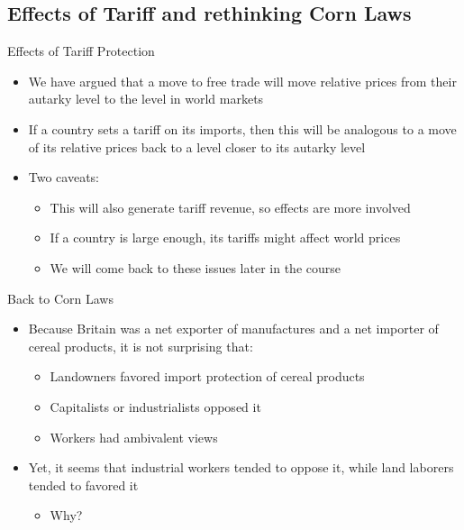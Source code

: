\documentclass[10pt,hyperref={CJKbookmarks=true},xcolor=dvipsnames,aspectratio=169]{beamer}
\begin{document}
\subsection{Effects of Tariff and rethinking Corn Laws}
\begin{frame}{Effects of Tariff Protection}

\begin{itemize}
\item We have argued that a move to free trade will move relative prices
from their autarky level to the level in world markets 
\item If a country sets a tariff on its imports, then this will be analogous
to a move of its relative prices back to a level closer to its autarky
level 
\item Two caveats: 

\begin{itemize}
\item This will also generate tariff revenue, so effects are more involved 
\item If a country is large enough, its tariffs might affect world prices 
\item We will come back to these issues later in the course 
\end{itemize}
\end{itemize}
\end{frame}

\begin{frame}{Back to Corn Laws }

\begin{itemize}
\item Because Britain was a net exporter of manufactures and a net importer
of cereal products, it is not surprising that: 

\begin{itemize}
\item Landowners favored import protection of cereal products 
\item Capitalists or industrialists opposed it 
\item Workers had ambivalent views
\end{itemize}
\item Yet, it seems that industrial workers tended to oppose it, while land
laborers tended to favored it 

\begin{itemize}
\item Why?
\end{itemize}
\end{itemize}
\end{frame}
\end{document}
